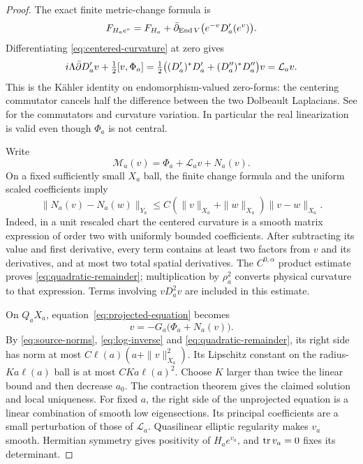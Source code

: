 \begin{proof}
The exact finite metric-change formula is
\[
 F_{H_ae^v}=F_{H_a}
   +\bar\partial_{\operatorname{End} V}\bigl(e^{-v}D'_a(e^v)\bigr).
\]
Differentiating \eqref{eq:centered-curvature} at zero gives
\[
 i\Lambda\bar\partial D'_av+\tfrac12[v,\Phi_a]
 =\tfrac12\bigl((D'_a)^*D'_a+(D''_a)^*D''_a\bigr)v
 =\mathcal L_av.
\]
This is the Kähler identity on endomorphism-valued zero-forms:
the centering commutator cancels half the difference between
the two Dolbeault Laplacians. See
\cite[(3.2.39)--(3.2.41), (6.3.16)--(6.3.17)]{Kobayashi87}
for the commutators and curvature variation.
In particular the real linearization is valid even though
\(\Phi_a\) is not central.

Write
\begin{equation}\label{eq:nonlinear-remainder}
 \mathcal M_a(v)=\Phi_a+\mathcal L_av+N_a(v).
\end{equation}
On a fixed sufficiently small \(X_a\) ball, the finite
change formula and the uniform scaled coefficients imply
\begin{equation}\label{eq:quadratic-remainder}
 \|N_a(v)-N_a(w)\|_{Y_a}
 \le C(\|v\|_{X_a}+\|w\|_{X_a})\|v-w\|_{X_a}.
\end{equation}
Indeed, in a unit rescaled chart the centered curvature is
a smooth matrix expression of order two with uniformly
bounded coefficients. After subtracting its value and
first derivative, every term contains at least two factors
from \(v\) and its derivatives, and at most two total spatial
derivatives. The \(C^{0,\alpha}\) product estimate proves
\eqref{eq:quadratic-remainder}; multiplication by \(\rho_a^2\)
converts physical curvature to that expression. Terms
involving \(vD_a^2v\) are included in this estimate.

On \(Q_aX_a\), equation~\eqref{eq:projected-equation} becomes
\[
 v=-G_a\bigl(\Phi_a+N_a(v)\bigr).
\]
By \eqref{eq:source-norms}, \eqref{eq:log-inverse} and
\eqref{eq:quadratic-remainder}, its right side has norm at most
\(C\ell(a)(a+\|v\|_{X_a}^2)\). Its Lipschitz constant
on the radius-\(Ka\ell(a)\) ball is at most \(CKa\ell(a)^2\).
Choose \(K\) larger than twice the linear bound and then
decrease \(a_0\). The contraction theorem gives the claimed
solution and local uniqueness. For fixed \(a\), the right
side of the unprojected equation is a linear combination
of smooth low eigensections. Its principal coefficients
are a small perturbation of those of \(\mathcal L_a\).
Quasilinear elliptic regularity makes \(v_a\) smooth.
Hermitian symmetry gives positivity of \(H_ae^{v_a}\),
and \(\operatorname{tr} v_a=0\) fixes its determinant.


\end{proof}
